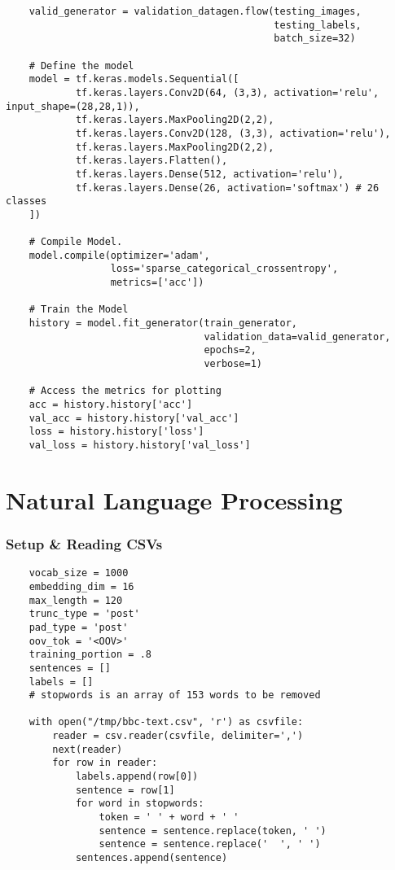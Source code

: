 \documentclass[11pt, a4paper]{article}
\begin{document}
\begin{spacing}{1.1}
\begin{lstlisting}
	valid_generator = validation_datagen.flow(testing_images,
	                                          testing_labels,
	                                          batch_size=32)
	
	# Define the model
	model = tf.keras.models.Sequential([
			tf.keras.layers.Conv2D(64, (3,3), activation='relu', input_shape=(28,28,1)),
			tf.keras.layers.MaxPooling2D(2,2),
			tf.keras.layers.Conv2D(128, (3,3), activation='relu'),
			tf.keras.layers.MaxPooling2D(2,2),
			tf.keras.layers.Flatten(),
			tf.keras.layers.Dense(512, activation='relu'),
			tf.keras.layers.Dense(26, activation='softmax') # 26 classes
	])
	
	# Compile Model. 
	model.compile(optimizer='adam',
	              loss='sparse_categorical_crossentropy',
	              metrics=['acc'])
	          
	# Train the Model
	history = model.fit_generator(train_generator,
	                              validation_data=valid_generator,
	                              epochs=2,
	                              verbose=1)          
	
	# Access the metrics for plotting
	acc = history.history['acc']
	val_acc = history.history['val_acc']
	loss = history.history['loss']
	val_loss = history.history['val_loss'] \end{lstlisting} \newpage

	\section{Natural Language Processing}
	\subsubsection{Setup \& Reading CSVs}
	\begin{lstlisting}
	vocab_size = 1000
	embedding_dim = 16
	max_length = 120
	trunc_type = 'post'
	pad_type = 'post'
	oov_tok = '<OOV>'
	training_portion = .8
	sentences = []
	labels = []
	# stopwords is an array of 153 words to be removed
	
	with open("/tmp/bbc-text.csv", 'r') as csvfile:
		reader = csv.reader(csvfile, delimiter=',')
		next(reader)
		for row in reader:
			labels.append(row[0])
			sentence = row[1]
			for word in stopwords:
				token = ' ' + word + ' '
				sentence = sentence.replace(token, ' ')
				sentence = sentence.replace('  ', ' ')
			sentences.append(sentence)	\end{lstlisting} \vspace*{1mm}
	

\end{spacing}
\end{document}
